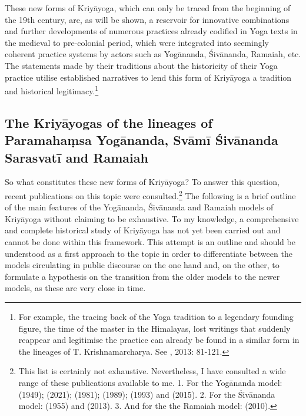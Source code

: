These new forms of Kriyāyoga, which can only be traced from the beginning of the 19th century, are, as will be shown, a reservoir for innovative combinations and further developments of numerous practices already codified in Yoga texts in the medieval to pre-colonial period, which were integrated into seemingly coherent practice systems by actors such as Yogānanda, Śivānanda, Ramaiah, etc. The statements made by their traditions about the historicity of their Yoga practice utilise established narratives to lend this form of Kriyāyoga a tradition and historical legitimacy.\footnote{For example, the tracing back of the Yoga tradition to a legendary founding figure, the time of the master in the Himalayas, lost writings that suddenly reappear and legitimise the practice can already be found in a similar form in the lineages of T. Krishnamarcharya. See \citeauthor{singleton2013gurus}, 2013: 81-121.}

\subsection{The Kriyāyogas of the lineages of Paramahaṃsa Yogānanda, Svāmī Śivānanda Sarasvatī and Ramaiah}

So what constitutes these new forms of Kriyāyoga? To answer this question, recent publications on this topic were consulted.\footnote{This list is certainly not exhaustive. Nevertheless, I have consulted a wide range of these publications available to me. 1. For the Yogānanda model: \citeauthor{autobioyogi} (1949); \citeauthor{kriyayogalowenstein} (2021); \citeauthor{kriyayogasarasvati1981} (1981); \citeauthor{hariharananda1989} (1989); \citeauthor{kriyayogaupanishad1993} (1993) and \citeauthor{kriyayogasturgess2015} (2015). 2. For the Śivānanda model: \citeauthor{shivanandakriya1982} (1955) and \citeauthor{kriyayoganityananda2013} (2013). 3. And for the the Ramaiah model: \citeauthor{govindan2010} (2010).} The following is a brief outline of the main features of the Yogānanda, Śivānanda and Ramaiah models of Kriyāyoga without claiming to be exhaustive. To my knowledge, a comprehensive and complete historical study of Kriyāyoga has not yet been carried out and cannot be done within this framework. This attempt is an outline and should be understood as a first approach to the topic in order to differentiate between the models circulating in public discourse on the one hand and, on the other, to formulate a hypothesis on the transition from the older models to the newer models, as these are very close in time.  

